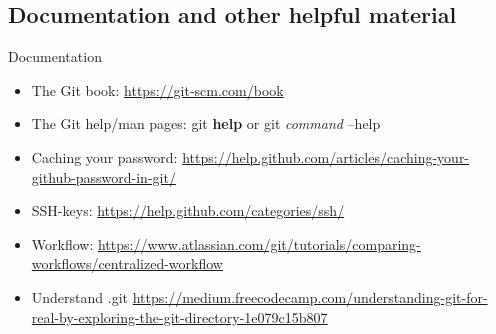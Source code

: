 \documentclass{beamer}
\begin{document}
\subsection{Documentation and other helpful material}
\begin{frame}{Documentation}
  \begin{itemize}
    \item The Git book: \url{https://git-scm.com/book}
    \item The Git help/man pages: git \textbf{help} or git \emph{command} --help
    \item Caching your password: \url{https://help.github.com/articles/caching-your-github-password-in-git/}
    \item SSH-keys: \url{https://help.github.com/categories/ssh/} 
    \item Workflow: \url{https://www.atlassian.com/git/tutorials/comparing-workflows/centralized-workflow}
    \item Understand .git \url{https://medium.freecodecamp.com/understanding-git-for-real-by-exploring-the-git-directory-1e079c15b807}
  \end{itemize}
\end{frame}
\end{document}
